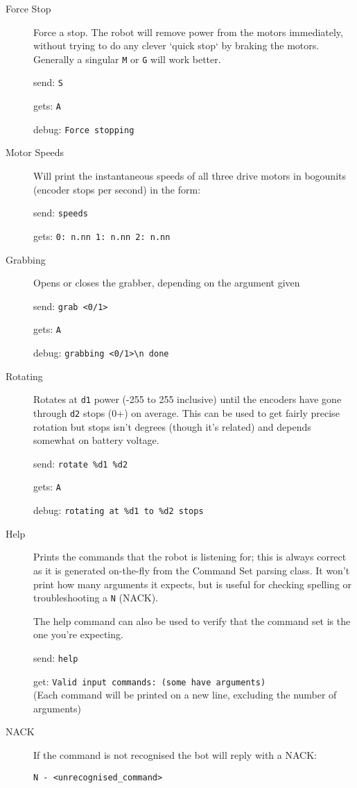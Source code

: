 \begin{description}
  
\item[Force Stop]
  Force a stop. The robot will remove power from the motors immediately, without trying to do any clever `quick stop` by braking the motors. Generally a singular \verb|M| or \verb|G| will work better.
  
  send: \verb|S|

  gets: \verb|A|

  debug: \verb|Force stopping|

  
\item[Motor Speeds]
  Will print the instantaneous speeds of all three drive motors in bogounits (encoder stops per second) in the form:

  send: \verb|speeds|
  
  gets: \verb|0: n.nn 1: n.nn 2: n.nn|


\item[Grabbing]
  Opens or closes the grabber, depending on the argument given

  send: \verb|grab <0/1>|

  gets: \verb|A|

  debug: \verb|grabbing <0/1>\n done|


\item[Rotating]
  Rotates at \texttt{d1} power (-255 to 255 inclusive) until the encoders have gone through \texttt{d2} stops (0+) on average. This can be used to get fairly precise rotation but stops isn't degrees (though it's related) and depends somewhat on battery voltage.

  send: \verb|rotate %d1 %d2|

  gets: \verb|A|

  debug: \verb|rotating at %d1 to %d2 stops|


\item[Help]
  Prints the commands that the robot is listening for; this is always correct as it is generated on-the-fly from the Command Set parsing class. It won't print how many arguments it expects, but is useful for checking spelling or troubleshooting a \texttt{N} (NACK).

  The help command can also be used to verify that the command set is the one you're expecting.

  send: \verb|help|

  get: \verb|Valid input commands: (some have arguments)|\\
  (Each command will be printed on a new line, excluding the number of arguments)


\item[NACK]
  If the command is not recognised the bot will reply with a NACK:

  \verb|N - <unrecognised_command>|

\end{description}
